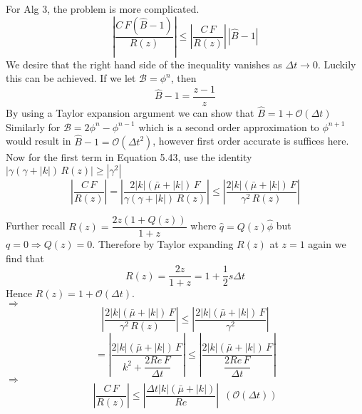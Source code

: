 For Alg 3, the problem is more complicated. 
\begin{equation}
|\dfrac{C \, F(\hat{B} - 1)}{R(z)}| \leq |\dfrac{C \, F}{R(z)}| \, | \hat{B} - 1|
\end{equation}
We desire that the right hand side of the inequality vanishes as $\Delta t \rightarrow 0$. Luckily this can be achieved. If we let $\mathcal{B} = \phi^n$, then
\begin{dmath*}
\hat{B} - 1 = \dfrac{z - 1}{z}
\end{dmath*}
By using a Taylor expansion argument we can show that $\hat{B} = 1+ \mathcal{O}(\Delta t)$\\

Similarly for $\mathcal{B} = 2 \phi^n - \phi^{n-1}$ which is a second order approximation to $\phi^{n+1}$ would result in $\hat{B} - 1 = \mathcal{O} (\Delta t^2)$, however first order accurate is suffices here.\\

Now for the first term in Equation 5.43, use the identity $| \gamma (\gamma + |k|) \, R(z) | \geqslant |\gamma^2|$
\begin{dmath*}
|\dfrac{C \, F}{R(z)}| = | \dfrac{2|k| (\bar{\mu} + |k|) \, F}{\gamma(\gamma + |k|) \, R(z)} |
\leq | \dfrac{2|k| (\bar{\mu} + |k|) \, F}{\gamma^2 \, R(z)} |
\end{dmath*}

Further recall $R(z) = \dfrac{2 z(1 + Q(z))}{1 + z}$ where $\hat{q} = Q(z)\hat{\phi}$ but $q = 0 \Rightarrow Q(z) = 0$. Therefore by Taylor expanding $R(z)$ at $z = 1$ again we find that
\begin{equation}
R(z) = \dfrac{2 z}{1 + z} = 1 + \dfrac{1}{2} s \Delta t
\end{equation}
Hence $R(z) = 1+\mathcal{O} (\Delta t)$.\\

$\Rightarrow$
\begin{equation}
| \dfrac{2|k| (\bar{\mu} + |k|) \, F}{\gamma^2 \, R(z)} | \leq | \dfrac{2|k| (\bar{\mu} + |k|) \, F}{\gamma^2}|
\end{equation}
\begin{equation*}
= |\dfrac{2|k| (\bar{\mu} + |k|) \, F}{k^2 + \dfrac{2 Re \, F}{\Delta t}}| 
\leq |\dfrac{2|k| (\bar{\mu} + |k|) \, F}{\dfrac{2 Re \, F}{\Delta t}}| 
\end{equation*}
$\Rightarrow$
\begin{dmath*}
|\dfrac{C \, F}{R(z)}| \leq |\dfrac{\Delta t |k| (\bar{\mu} + |k|)}{Re}| \, \, \, (\mathcal{O} (\Delta t))
\end{dmath*}

